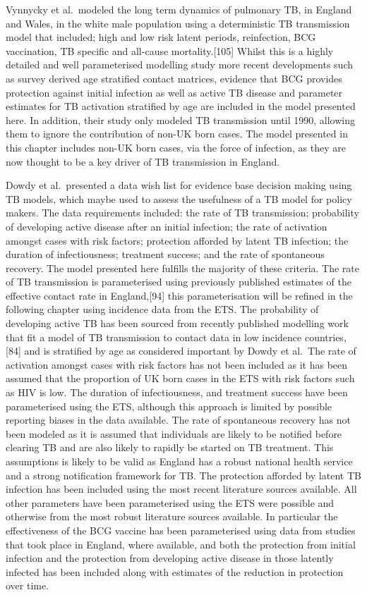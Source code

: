 \documentclass[11pt,twoside]{bristolthesis}
\begin{document}
  Vynnycky et al.~modeled the long term dynamics of pulmonary TB, in England and Wales, in the white male population using a deterministic TB transmission model that included; high and low risk latent periods, reinfection, BCG vaccination, TB specific and all-cause mortality.{[}105{]} Whilst this is a highly detailed and well parameterised modelling study more recent developments such as survey derived age stratified contact matrices, evidence that BCG provides protection against initial infection as well as active TB disease and parameter estimates for TB activation stratified by age are included in the model presented here. In addition, their study only modeled TB transmission until 1990, allowing them to ignore the contribution of non-UK born cases. The model presented in this chapter includes non-UK born cases, via the force of infection, as they are now thought to be a key driver of TB transmission in England.
  
  Dowdy et al.~presented a data wish list for evidence base decision making using TB models, which maybe used to assess the usefulness of a TB model for policy makers. The data requirements included: the rate of TB transmission; probability of developing active disease after an initial infection; the rate of activation amongst cases with risk factors; protection afforded by latent TB infection; the duration of infectiousness; treatment success; and the rate of spontaneous recovery. The model presented here fulfills the majority of these criteria. The rate of TB transmission is parameterised using previously published estimates of the effective contact rate in England,{[}94{]} this parameterisation will be refined in the following chapter using incidence data from the ETS. The probability of developing active TB has been sourced from recently published modelling work that fit a model of TB transmission to contact data in low incidence countries,{[}84{]} and is stratified by age as considered important by Dowdy et al.~The rate of activation amongst cases with risk factors has not been included as it has been assumed that the proportion of UK born cases in the ETS with risk factors such as HIV is low. The duration of infectiousness, and treatment success have been parameterised using the ETS, although this approach is limited by possible reporting biases in the data available. The rate of spontaneous recovery has not been modeled as it is assumed that individuals are likely to be notified before clearing TB and are also likely to rapidly be started on TB treatment. This assumptions is likely to be valid as England has a robust national health service and a strong notification framework for TB. The protection afforded by latent TB infection has been included using the most recent literature sources available. All other parameters have been parameterised using the ETS were possible and otherwise from the most robust literature sources available. In particular the effectiveness of the BCG vaccine has been parameterised using data from studies that took place in England, where available, and both the protection from initial infection and the protection from developing active disease in those latently infected has been included along with estimates of the reduction in protection over time.
  
\end{document}
